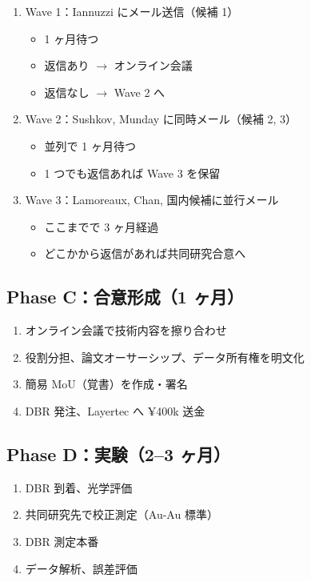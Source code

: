 \documentclass[11pt,a4paper]{article}
\def\textbf#1{#1}%
\begin{document}
\begin{enumerate}
\item \textbf{Wave 1}：Iannuzzi にメール送信（候補 1）
  \begin{itemize}
  \item 1 ヶ月待つ
  \item 返信あり $\to$ オンライン会議
  \item 返信なし $\to$ Wave 2 へ
  \end{itemize}
\item \textbf{Wave 2}：Sushkov, Munday に同時メール（候補 2, 3）
  \begin{itemize}
  \item 並列で 1 ヶ月待つ
  \item 1 つでも返信あれば Wave 3 を保留
  \end{itemize}
\item \textbf{Wave 3}：Lamoreaux, Chan, 国内候補に並行メール
  \begin{itemize}
  \item ここまでで 3 ヶ月経過
  \item どこかから返信があれば共同研究合意へ
  \end{itemize}
\end{enumerate}

\subsection{Phase C：合意形成（1 ヶ月）}

\begin{enumerate}
\item オンライン会議で技術内容を擦り合わせ
\item 役割分担、論文オーサーシップ、データ所有権を明文化
\item 簡易 MoU（覚書）を作成・署名
\item DBR 発注、Layertec へ ¥400k 送金
\end{enumerate}

\subsection{Phase D：実験（2--3 ヶ月）}

\begin{enumerate}
\item DBR 到着、光学評価
\item 共同研究先で校正測定（Au-Au 標準）
\item DBR 測定本番
\item データ解析、誤差評価
\end{enumerate}
\end{document}
